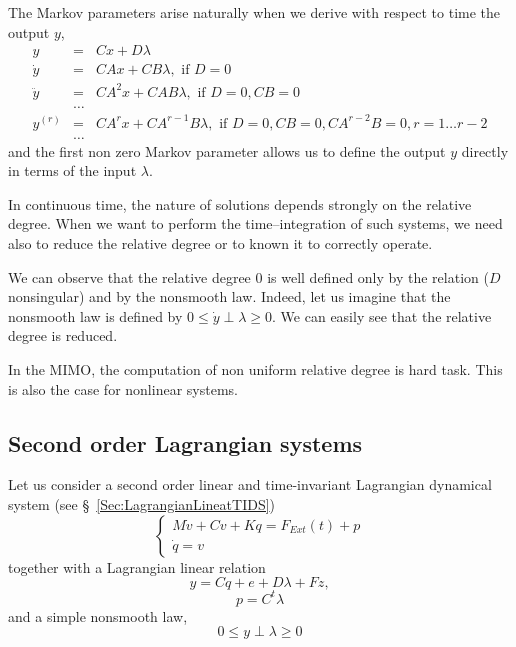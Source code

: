     The Markov parameters arise naturally when we derive with respect
    to time the output $y$,
    \begin{eqnarray*}
      \label{eq:y-derive}
      y &=& C x + D \lambda \\
      \dot y &=& CA x + CB \lambda, \text{ if } D= 0  \\
      \ddot y &=& CA^2 x + CAB \lambda, \text{ if }  D=0, CB=0\\
      &\ldots& \\
      y^{(r)} &=& CA^{r} x + CA^{r-1}B \lambda, \text{ if } D=0, CB=0, CA^{r-2}B=0, r=1\ldots r-2 \\
      &\ldots&
    \end{eqnarray*}
    and the first non zero Markov parameter allows us to define the
    output $y$ directly in terms of the input $\lambda$.

In continuous time, the nature of solutions depends strongly on the relative degree. When we want to perform the time--integration of such systems, we need also to reduce the relative degree or to known it to correctly operate.

We can observe that the relative degree $0$ is well defined only by the relation ($D$ nonsingular) and by the nonsmooth law. Indeed, let us imagine that the nonsmooth law is defined by $0\leq\dot y \perp \lambda \geq 0 $. We can easily see that the relative degree is reduced.

In the MIMO, the computation of non uniform relative degree is hard task. This is also the case for nonlinear systems.



\subsection{Second order Lagrangian systems}


Let us consider a second order linear and time-invariant Lagrangian dynamical system (see \S~\ref{Sec:LagrangianLineatTIDS})
\begin{equation}
  \label{eq:rd1}
  \begin{cases}
    M \dot v + C v + K q = F_{Ext}(t) + p \\
    \dot q = v
  \end{cases}
\end{equation}
together with a Lagrangian linear relation
\begin{equation}
  y= Cq + e + D \lambda + Fz,
  \label{eq:rd2}
\end{equation}
\begin{equation}
  p = C^t \lambda
\label{eq:rd3}  
\end{equation}
and a simple nonsmooth law,
\begin{equation}
  0\leq y \perp \lambda \geq 0
\label{eq:rd4}  
\end{equation}

